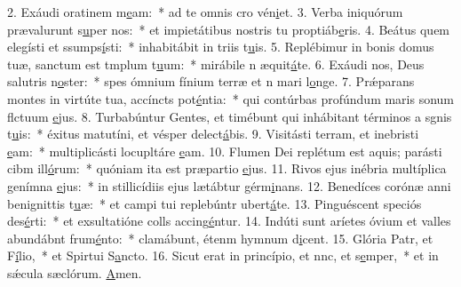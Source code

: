 2. Exáudi oratinem m\uline{e}am:~* ad te omnis cro vén\uline{i}et.
3. Verba iniquórum prævalurunt s\uline{u}per nos:~* et impietátibus nostris tu proptiáb\uline{e}ris.
4. Beátus quem elegísti et ssumps\uline{í}sti:~* inhabitábit in triis t\uline{u}is.
5. Replébimur in bonis domus tuæ, sanctum est tmplum t\uline{u}um:~* mirábile n æquit\uline{á}te.
6. Exáudi nos, Deus salutris n\uline{o}ster:~* spes ómnium fínium terræ et n mari l\uline{o}nge.
7. Prǽparans montes in virtúte tua, accíncts pot\uline{é}ntia:~* qui contúrbas profúndum maris sonum flctuum \uline{e}jus.
8. Turbabúntur Gentes, et timébunt qui inhábitant términos a sgnis t\uline{u}is:~* éxitus matutíni, et vésper delect\uline{á}bis.
9. Visitásti terram, et inebristi \uline{e}am:~* multiplicásti locupltáre \uline{e}am.
10. Flumen Dei replétum est aquis; parásti cibm ill\uline{ó}rum:~* quóniam ita est præpartio \uline{e}jus.
11. Rivos ejus inébria multíplica genímna \uline{e}jus:~* in stillicídiis ejus lætábtur gérm\uline{i}nans.
12. Benedíces corónæ anni benignittis t\uline{u}æ:~* et campi tui replebúntr ubert\uline{á}te.
13. Pinguéscent speciós des\uline{é}rti:~* et exsultatióne colls accing\uline{é}ntur.
14. Indúti sunt aríetes óvium et valles abundábnt frum\uline{é}nto:~* clamábunt, étenm hymnum d\uline{i}cent.
15. Glória Patr, et F\uline{í}lio,~* et Spirtui S\uline{a}ncto.
16. Sicut erat in princípio, et nnc, et s\uline{e}mper,~* et in sǽcula sæclórum. \uline{A}men.
